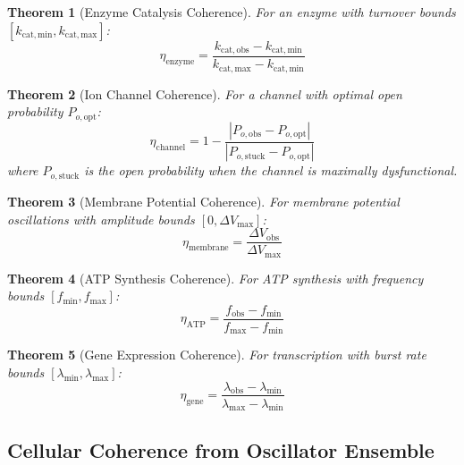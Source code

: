 \documentclass[aps,prd,twocolumn,superscriptaddress,floatfix,nofootinbib]{revtex4-2}
\newtheorem{theorem}{Theorem}[section]
\theoremstyle{remark}
\begin{document}
\begin{theorem}[Enzyme Catalysis Coherence]
\label{thm:enzyme_coherence}
For an enzyme with turnover bounds $[k_{\mathrm{cat,min}}, k_{\mathrm{cat,max}}]$:
\begin{equation}
\eta_{\mathrm{enzyme}} = \frac{k_{\mathrm{cat,obs}} - k_{\mathrm{cat,min}}}{k_{\mathrm{cat,max}} - k_{\mathrm{cat,min}}}
\end{equation}
\end{theorem}

\begin{theorem}[Ion Channel Coherence]
\label{thm:channel_coherence}
For a channel with optimal open probability $P_{o,\mathrm{opt}}$:
\begin{equation}
\eta_{\mathrm{channel}} = 1 - \frac{|P_{o,\mathrm{obs}} - P_{o,\mathrm{opt}}|}{|P_{o,\mathrm{stuck}} - P_{o,\mathrm{opt}}|}
\end{equation}
where $P_{o,\mathrm{stuck}}$ is the open probability when the channel is maximally dysfunctional.
\end{theorem}

\begin{theorem}[Membrane Potential Coherence]
\label{thm:membrane_coherence}
For membrane potential oscillations with amplitude bounds $[0, \Delta V_{\max}]$:
\begin{equation}
\eta_{\mathrm{membrane}} = \frac{\Delta V_{\mathrm{obs}}}{\Delta V_{\max}}
\end{equation}
\end{theorem}

\begin{theorem}[ATP Synthesis Coherence]
\label{thm:atp_coherence}
For ATP synthesis with frequency bounds $[f_{\min}, f_{\max}]$:
\begin{equation}
\eta_{\mathrm{ATP}} = \frac{f_{\mathrm{obs}} - f_{\min}}{f_{\max} - f_{\min}}
\end{equation}
\end{theorem}

\begin{theorem}[Gene Expression Coherence]
\label{thm:gene_coherence}
For transcription with burst rate bounds $[\lambda_{\min}, \lambda_{\max}]$:
\begin{equation}
\eta_{\mathrm{gene}} = \frac{\lambda_{\mathrm{obs}} - \lambda_{\min}}{\lambda_{\max} - \lambda_{\min}}
\end{equation}
\end{theorem}

\subsection{Cellular Coherence from Oscillator Ensemble}
\end{document}
